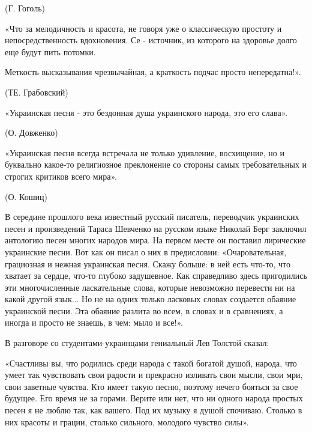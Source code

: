 (Г. Гоголь)



«Что за мелодичность и красота, не говоря уже о классическую простоту и непосредственность вдохновения. Се - источник, из которого на здоровье долго еще будут пить потомки.



Меткость высказывания чрезвычайная, а краткость подчас просто непередатна!».



(ТЕ. Грабовский)



«Украинская песня - это бездонная душа украинского народа, это его слава».



(О. Довженко)



«Украинская песня всегда встречала не только удивление, восхищение, но и буквально какое-то религиозное преклонение со стороны самых требовательных и строгих критиков всего мира».



(О. Кошиц)



В середине прошлого века известный русский писатель, переводчик украинских песен и произведений Тараса Шевченко на русском языке Николай Берг заключил антологию песен многих народов мира. На первом месте он поставил лирические украинские песни. Вот как он писал о них в предисловии: «Очаровательная, грациозная и нежная украинская песня. Скажу больше: в ней есть что-то, что хватает за сердце, что-то глубоко задушевное. Как справедливо здесь пригодились эти многочисленные ласкательные слова, которые невозможно перевести ни на какой другой язык... Но не на одних только ласковых словах создается обаяние украинской песни. Эта обаяние разлита во всем, в словах и в сравнениях, а иногда и просто не знаешь, в чем: мыло и все!».



В разговоре со студентами-украинцами гениальный Лев Толстой сказал:



«Счастливы вы, что родились среди народа с такой богатой душой, народа, что умеет так чувствовать свои радости и прекрасно изливать свои мысли, свои мри, свои заветные чувства. Кто имеет такую песню, поэтому нечего бояться за свое будущее. Его время не за горами. Верите или нет, что ни одного народа простых песен я не люблю так, как вашего. Под их музыку я душой спочиваю. Столько в них красоты и грации, столько сильного, молодого чувство силы».



